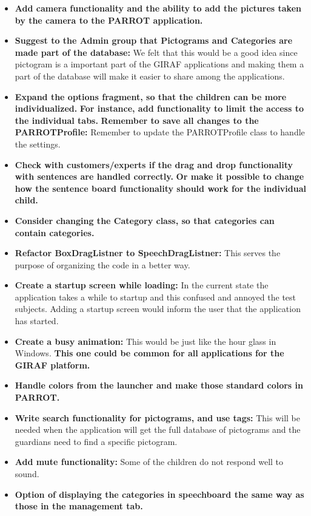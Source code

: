 \begin{itemize}
	\item \textbf{Add camera functionality and the ability to add the pictures taken by the camera to the PARROT application.}
	\item \textbf{Suggest to the Admin group that Pictograms and Categories are made part of the database:} We felt that this would be a good idea since pictogram is a important part of the GIRAF applications and making them a part of the database will make it easier to share among the applications. 
	\item \textbf{Expand the options fragment, so that the children can be more individualized.}		
		\subitem \textbf{For instance, add functionality to limit the access to the individual tabs.}
		\subitem \textbf{Remember to save all changes to the PARROTProfile:} Remember to update the PARROTProfile class to handle the settings.
 		
	\item \textbf{Check with customers/experts if the drag and drop functionality with sentences are handled correctly.}
		\subitem \textbf{Or make it possible to change how the sentence board functionality should work for the individual child.}
	\item \textbf{Consider changing the Category class, so that categories can contain categories.}
	
	\item \textbf{Refactor BoxDragListner to SpeechDragListner:} This serves the purpose of organizing the code in a better way.
	\item \textbf{Create a startup screen while loading:} In the current state the application takes a while to startup and this confused	and annoyed the test subjects. Adding a startup screen would inform the user that the application has started.
	
	\item \textbf{Create a busy animation:} This would be just like the hour glass in Windows. 
		\subitem \textbf{This one could be common for all applications for the GIRAF platform.}
	\item \textbf{Handle colors from the launcher and make those standard colors in PARROT.}
	\item \textbf{Write search functionality for pictograms, and use tags:} This will be needed when the application will get the full database of pictograms and the guardians need to find a specific pictogram. 

	\item \textbf{Add mute functionality:} Some of the children do not respond well to sound.
	
	\item \textbf{Option of displaying the categories in speechboard the same way as those in the management tab.}
	
\end{itemize}  

